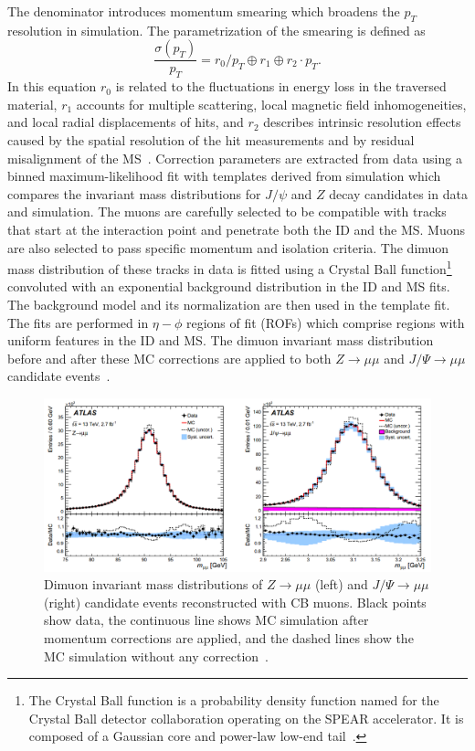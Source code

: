 The denominator introduces momentum smearing which broadens the $p_T$ resolution in simulation. The parametrization of the smearing is defined as
\begin{equation}
    \frac{\sigma(p_T)}{p_T} = r_0/p_T \oplus r_1 \oplus r_2 \cdot p_T .
\end{equation}
In this equation $r_0$ is related to the fluctuations in energy loss in the traversed material, $r_1$ accounts for multiple scattering, local magnetic field inhomogeneities, and local radial displacements of hits, and $r_2$ describes intrinsic resolution effects caused by the spatial resolution of the hit measurements and by residual misalignment of the MS~\cite{MCPpaper}. 
Correction parameters are extracted from data using a binned maximum-likelihood fit with templates derived from simulation which compares the invariant mass distributions for $J/\psi$ and $Z$ decay candidates in data and simulation. The muons are carefully selected to be compatible with tracks that start at the interaction point and penetrate both the ID and the MS. Muons are also selected to pass specific momentum and isolation criteria. The dimuon mass distribution of these tracks in data is fitted using a Crystal Ball function\footnote{The Crystal Ball function is a probability density function named for the Crystal Ball detector collaboration operating on the SPEAR accelerator. It is composed of a Gaussian core and power-law low-end tail~\cite{CrystalBall}.} convoluted with an exponential background distribution in the ID and MS fits. The background model and its normalization are then used in the template fit. The fits are performed in $\eta-\phi$ regions of fit (ROFs) which comprise regions with uniform features in the ID and MS. The dimuon invariant mass distribution before and after these MC corrections are applied to both $Z\rightarrow\mu\mu$ and $J/\Psi\rightarrow\mu\mu$ candidate events~\cite{MCPpaper}. 

\begin{figure}[!h]
        \centering
    \includegraphics[width=.85\textwidth]{Pictures/dimuonmassfits.png}
    \caption{ Dimuon invariant mass distributions of $Z\rightarrow\mu\mu$ (left) and $J/\Psi\rightarrow\mu\mu$ (right) candidate events reconstructed with CB muons. Black points show data, the continuous line shows MC simulation after momentum corrections are applied, and the dashed lines show the MC simulation without any correction~\cite{MCPpaper}.}
    \label{fig:dimuonmassfits}
\end{figure}

